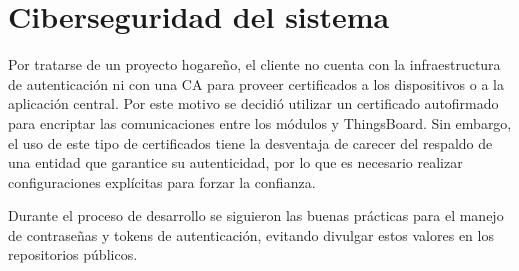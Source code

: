 


\pagebreak
\section{Ciberseguridad del sistema}
\label{sec:Ciberseguridad del sistema}



Por tratarse de un proyecto hogareño, el cliente no cuenta con la infraestructura de autenticación ni con una CA para proveer certificados a los dispositivos o a la aplicación central.
Por este motivo se decidió utilizar un certificado autofirmado para encriptar las comunicaciones entre los módulos y ThingsBoard. Sin embargo, el uso de este tipo de certificados tiene la desventaja de carecer del respaldo de una entidad que garantice su autenticidad, por lo que es necesario realizar configuraciones explícitas para forzar la confianza.


Durante el proceso de desarrollo se siguieron las buenas prácticas para el manejo de contraseñas y tokens de autenticación, evitando divulgar estos valores en los repositorios públicos.




